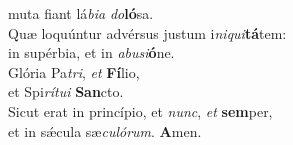 \oddverse muta fiant lá\textit{bi}\textit{a} \textit{do}\textbf{ló}sa.\\
\evenverse Quæ loquúntur advérsus justum i\textit{ni}\textit{qui}\textbf{tá}tem:~\*\\
\evenverse in supérbia, et in \textit{a}\textit{bu}\textit{si}\textbf{ó}ne.\\
\oddverse Glória Pa\textit{tri}, \textit{et} \textbf{Fí}lio,~\*\\
\oddverse et Spi\textit{rí}\textit{tu}\textit{i} \textbf{San}cto.\\
\evenverse Sicut erat in princípio, et \textit{nunc}, \textit{et} \textbf{sem}per,~\*\\
\evenverse et in sǽcula sæ\textit{cu}\textit{ló}\textit{rum}. \textbf{A}men.\\
